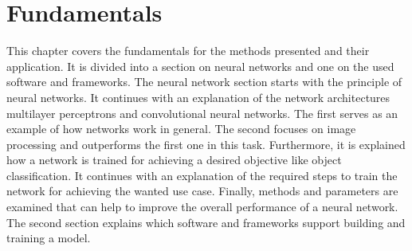 \chapter{Fundamentals}
\label{sec:fundamentals}
This chapter covers the fundamentals for the methods presented and their application.
It is divided into a section on neural networks and one on the used software and frameworks.
The neural network section starts with the principle of neural networks.
It continues with an explanation of the network architectures multilayer perceptrons and convolutional neural networks.
The first serves as an example of how networks work in general.
The second focuses on image processing and outperforms the first one in this task.
Furthermore, it is explained how a network is trained for achieving a desired objective like object classification.
It continues with an explanation of the required steps to train the network for achieving the wanted use case.
Finally, methods and parameters are examined that can help to improve the overall performance of a neural network.
The second section explains which software and frameworks support building and training a model.


